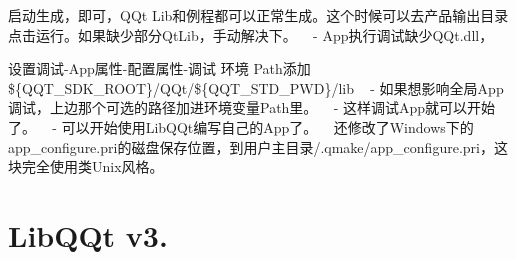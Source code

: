 \begin{DoxyItemize}
\begin{DoxyItemize}
\item 启动生成，即可，\+Q\+Qt Lib和例程都可以正常生成。这个时候可以去产品输出目录点击运行。如果缺少部分\+Qt\+Lib，手动解决下。 ~\newline
 -\/ App执行调试缺少\+Q\+Qt.\+dll，
\begin{DoxyItemize}
\item 设置调试-\/\+App属性-\/配置属性-\/调试 环境 Path添加\$\{Q\+Q\+T\+\_\+\+S\+D\+K\+\_\+\+R\+O\+OT\}/\+Q\+Qt/\$\{Q\+Q\+T\+\_\+\+S\+T\+D\+\_\+\+P\+WD\}/lib ~\newline
 -\/ 如果想影响全局\+App调试，上边那个可选的路径加进环境变量\+Path里。 ~\newline
 -\/ 这样调试\+App就可以开始了。 ~\newline
-\/ 可以开始使用\+Lib\+Q\+Qt编写自己的\+App了。 ~\newline
 还修改了\+Windows下的app\+\_\+configure.\+pri的磁盘保存位置，到用户主目录/.qmake/app\+\_\+configure.\+pri，这块完全使用类\+Unix风格。 ~\newline
 \section*{Lib\+Q\+Qt v3.}
\end{DoxyItemize}
\end{DoxyItemize}
\end{DoxyItemize}

